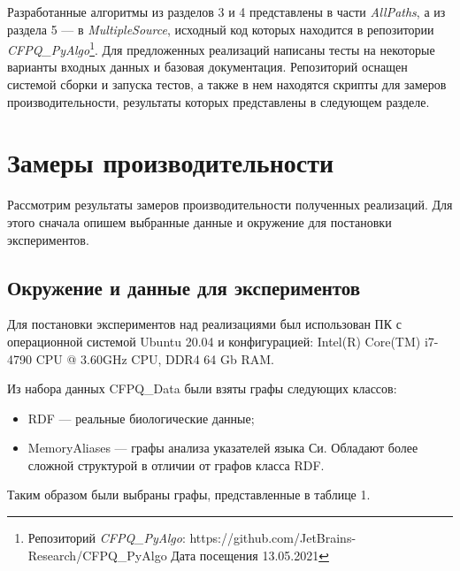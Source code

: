 Разработанные алгоритмы из разделов 3 и 4 представлены в части \textit{AllPaths}, а из раздела 5 --- в \textit{MultipleSource}, исходный код которых находится в репозитории \textit{CFPQ\_PyAlgo}\footnote{Репозиторий \textit{CFPQ\_PyAlgo}: https://github.com/JetBrains-Research/CFPQ\_PyAlgo Дата посещения 13.05.2021}. Для предложенных реализаций написаны тесты на некоторые варианты входных данных и базовая документация. Репозиторий оснащен системой сборки и запуска тестов, а также в нем находятся скрипты для замеров производительности, результаты которых представлены в следующем разделе.

\section{Замеры производительности}
Рассмотрим результаты замеров производительности полученных реализаций. Для этого сначала опишем выбранные данные и окружение для постановки экспериментов.

\subsection{Окружение и данные для экспериментов}

Для постановки экспериментов над реализациями был использован ПК с операционной системой Ubuntu 20.04 и конфигурацией: Intel(R) Core(TM) i7-4790 CPU @ 3.60GHz CPU, DDR4 64 Gb RAM.

Из набора данных CFPQ\_Data были взяты графы следующих классов:
\begin{itemize}
    \item RDF --- реальные биологические данные;
    \item MemoryAliases --- графы анализа указателей языка Си. Обладают более сложной структурой в отличии от графов класса RDF.
\end{itemize}

Таким образом были выбраны графы, представленные в таблице 1.

